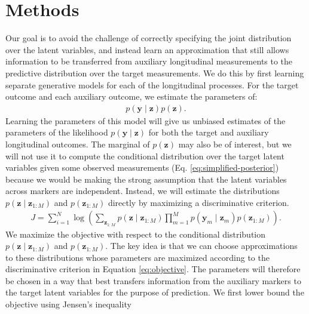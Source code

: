 \documentclass[12pt]{article}
\newcommand{\given}{\mid}
\begin{document}

\section{Methods}

Our goal is to avoid the challenge of correctly specifying the joint distribution over the latent variables, and instead learn an approximation that still allows information to be transferred from auxiliary longitudinal measurements to the predictive distribution over the target measurements. We do this by first learning separate generative models for each of the longitudinal processes. For the target outcome and each auxiliary outcome, we estimate the parameters of:
\begin{align}
p(\bm{y} \given \bm{z}) p(\bm{z}).
\end{align}
Learning the parameters of this model will give us unbiased estimates of the parameters of the likelihood $p(\bm{y} \given \bm{z})$ for both the target and auxiliary longitudinal outcomes. The marginal of $p(\bm{z})$ may also be of interest, but we will not use it to compute the conditional distribution over the target latent variables given some observed measurements (Eq. \ref{eq:simplified-posterior}) because we would be making the strong assumption that the latent variables across markers are independent. Instead, we will estimate the distributions $p(\bm{z} \given \bm{z}_{1:M})$ and $p(\bm{z}_{1:M})$ directly by maximizing a discriminative criterion.
\begin{align}
\label{eq:objective}
J =
\sum_{i=1}^N \log \left(
	\sum_{\bm{z}_{1:M}} p(\bm{z} \given \bm{z}_{1:M}) \prod_{m=1}^M p(\bm{y}_m \given \bm{z}_m) p(\bm{z}_{1:M})
\right).
\end{align}
We maximize the objective with respect to the conditional distribution \mbox{$p(\bm{z} \given \bm{z}_{1:M})$} and $p(\bm{z}_{1:M})$. The key idea is that we can choose approximations to these distributions whose parameters are maximized according to the discriminative criterion in Equation \ref{eq:objective}. The parameters will therefore be chosen in a way that best transfers information from the auxiliary markers to the target latent variables for the purpose of prediction. We first lower bound the objective using Jensen's inequality
\end{document}
